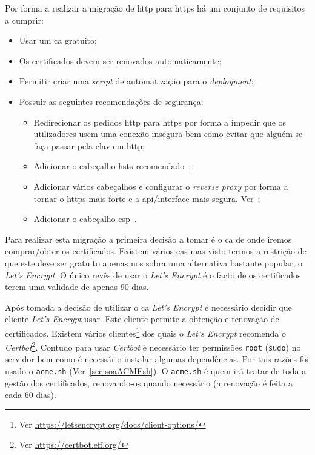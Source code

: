 Por forma a realizar a migração de \acrshort{http} para \acrshort{https} há um conjunto de requisitos a cumprir:\label{sec:sol_httpsReq}
\begin{itemize}
    \item Usar um \acrshort{ca} gratuito;
    \item Os certificados devem ser renovados automaticamente;
    \item Permitir criar uma \textit{script} de automatização para o \textit{deployment};
    \item Possuir as seguintes recomendações de segurança:
    \begin{itemize}
        \item Redirecionar os pedidos \acrshort{http} para \acrshort{https} por forma a impedir que os 
        utilizadores usem uma conexão insegura bem como evitar que alguém se faça passar pela \acrshort{clav} 
        em \acrshort{http};
        \item Adicionar o cabeçalho \acrshort{hsts} recomendado~\cite{hsts,hsts2};
        \item Adicionar vários cabeçalhos e configurar o \textit{reverse proxy} por forma a tornar o 
        \acrshort{https} mais forte e a \acrshort{api}/interface mais segura. 
        Ver~\cite{helmet,letEnA+,dhparams,secExpress,strongSSL};
        \item Adicionar o cabeçalho \acrfull{csp}~\cite{helmetCSP,csp}.
    \end{itemize}
\end{itemize}

Para realizar esta migração a primeira decisão a tomar é o \acrfull{ca} de onde iremos comprar/obter os 
certificados. Existem vários \acrshort{ca}s mas visto termos a restrição de que este deve ser gratuito 
apenas nos sobra uma alternativa bastante popular, o \textit{Let's Encrypt}. 
O único revês de usar o \textit{Let's Encrypt} é o facto de os certificados terem uma validade de apenas 90 dias.

Após tomada a decisão de utilizar o \acrshort{ca} \textit{Let's Encrypt} é necessário decidir que cliente 
\textit{Let's Encrypt} usar. Este cliente permite a obtenção e renovação de certificados. 
Existem vários clientes\footnote{Ver \url{https://letsencrypt.org/docs/client-options/}} dos quais o 
\textit{Let's Encrypt} recomenda o \textit{Certbot}\footnote{Ver \url{https://certbot.eff.org/}}. 
Contudo para usar \textit{Certbot} é necessário ter permissões \texttt{root} (\texttt{sudo}) no servidor bem 
como é necessário instalar algumas dependências. 
Por tais razões foi usado o \texttt{acme.sh} (Ver~\ref{sec:soaACMEsh}). 
O \texttt{acme.sh} é quem irá tratar de toda a gestão dos certificados, renovando-os quando necessário 
(a renovação é feita a cada 60 dias).

